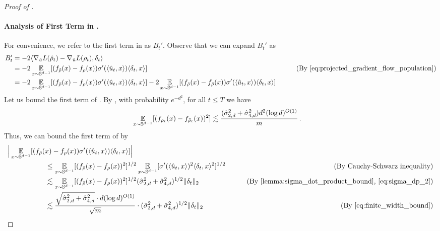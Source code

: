 \begin{proof}[Proof of ]
\paragraph{Analysis of First Term in .} For convenience, we refer to the first term in  as $B_t'$. Observe that we can expand $B_t'$ as
\begin{align}
B_t' 
& = -2 \langle \nabla_{\uhat} L(\rhohat_t) - \nabla_{\uhat} L(\rho_t), \vv_t \rangle \\
& = -2 \E_{x \sim \bbS^{d - 1}} [(f_{\rhohat}(x) - f_{\rho}(x)) \sigma'(\langle \uhat_t, x \rangle) \langle \vv_t, x \rangle]
& \tag{By \Cref{eq:projected_gradient_flow_population}} \\
& = -2 \E_{x \sim \bbS^{d - 1}} [(f_{\rhobar}(x) - f_\rho(x)) \sigma'(\langle \uhat_t, x \rangle) \langle \vv_t, x \rangle] -2 \E_{x \sim \bbS^{d - 1}} [(f_{\rhohat}(x) - f_{\rhobar}(x)) \sigma'(\langle \uhat_t, x \rangle) \langle \vv_t, x \rangle] \label{eq:bt_1}
\end{align}
Let us bound the first term of . By , with probability $e^{-d^2}$, for all $t \leq T$ we have
\begin{align}
\operatorname*{\mathbb{E}}_{x \sim \mathbb{S}^{d - 1}} [(f_{\rho_t}(x) - f_{{\bar{\rho}}_t}(x))^2]
& \lesssim \frac{(\hat{\sigma}_{2, d}^2 + \hat{\sigma}_{4, d}^2) d^2 (\log d)^{O(1)}}{m} \,. \label{eq:finite_width_bound}
\end{align}
Thus, we can bound the first term of  by
\begin{align}
& \Big| \E_{x \sim \bbS^{d - 1}} [(f_{\rhobar}(x) - f_\rho(x)) \sigma'(\langle \uhat_t, x \rangle) \langle \vv_t, x \rangle] \Big| \\
& \nextlinespace\nextlinespace \leq \E_{x \sim \bbS^{d - 1}} [(f_{\rhobar}(x) - f_{\rho}(x))^2]^{1/2} \E_{x \sim \bbS^{d - 1}} [\sigma'(\langle \uhat_t, x \rangle)^2 \langle \vv_t, x \rangle^2]^{1/2}
& \tag{By Cauchy-Schwarz inequality} \\
& \nextlinespace\nextlinespace \lesssim \E_{x \sim \bbS^{d - 1}} [(f_{\rhobar}(x) - f_\rho(x))^2]^{1/2} (\sigmaCoeffTwo^2 + \sigmaCoeffFour^2)^{1/2} \|\delta_t\|_2
& \tag{By \Cref{lemma:sigma_dot_product_bound}, \Cref{eq:sigma_dp_2}} \\
& \nextlinespace\nextlinespace \lesssim \frac{\sqrt{\sigmaCoeffTwo^2 + \sigmaCoeffFour^2} \cdot d (\log d)^{O(1)}}{\sqrt{m}} \cdot (\sigmaCoeffTwo^2 + \sigmaCoeffFour^2)^{1/2} \|\delta_t\|_2
& \tag{By \Cref{eq:finite_width_bound}} \\

\end{align}
\end{proof}
